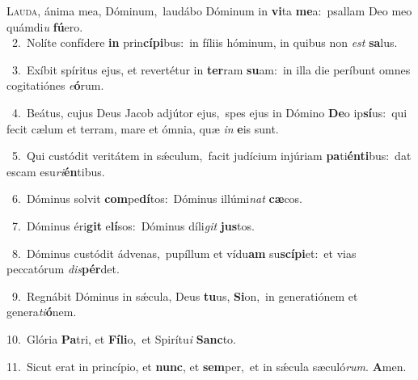 \lettrine{\initial\textcolor{\initialcolor}{L}}{auda,} ánima mea, Dóminum,~\dagger laudábo Dóminum in \textbf{vi}\-ta \textbf{me}\-a:~\star psallam Deo meo quámdi\textit{u} \textbf{fú}\-ero.\\
{\numbfont\textcolor{\numbcolor}{~2.}}~Nolíte confídere \textbf{in} prin\-\textbf{cí}\-\textbf{pi}bus:~\star in fíliis hóminum, in quibus non \textit{est} \textbf{sa}\-lus.\par
{\numbfont\textcolor{\numbcolor}{~3.}}~Exíbit spíritus ejus, et revertétur in \textbf{ter}\-ram \textbf{su}\-am:~\star in illa die períbunt omnes cogitatiónes \textit{e}\-\textbf{ó}rum.\par
{\numbfont\textcolor{\numbcolor}{~4.}}~Beátus, cujus Deus Jacob adjútor ejus,~\dagger spes ejus in Dómino \textbf{De}\-o ip\-\textbf{sí}\-us:~\star qui fecit cælum et terram, mare et ómnia, quæ \textit{in} \textbf{e}\-is sunt.\par
{\numbfont\textcolor{\numbcolor}{~5.}}~Qui custódit veritátem in sǽculum,~\dagger facit judícium injúriam \textbf{pa}\-ti\-\textbf{én}\-\textbf{ti}bus:~\star dat escam esu\-\textit{ri}\-\textbf{én}tibus.\par
{\numbfont\textcolor{\numbcolor}{~6.}}~Dóminus solvit \textbf{com}\-pe\-\textbf{dí}\-tos:~\star Dóminus illúmi\textit{nat} \textbf{cæ}\-cos.\par
{\numbfont\textcolor{\numbcolor}{~7.}}~Dóminus éri\textbf{git} e\-\textbf{lí}\-sos:~\star Dóminus díli\textit{git} \textbf{jus}\-tos.\par
{\numbfont\textcolor{\numbcolor}{~8.}}~Dóminus custódit ádvenas,~\dagger pupíllum et vídu\textbf{am} su\-\textbf{scí}\-\textbf{pi}et:~\star et vias peccatórum \textit{dis}\-\textbf{pér}det.\par
{\numbfont\textcolor{\numbcolor}{~9.}}~Regnábit Dóminus in sǽcula, Deus \textbf{tu}\-us, \textbf{Si}\-on,~\star in generatiónem et genera\-\textit{ti}\-\textbf{ó}nem.\par
{\numbfont\textcolor{\numbcolor}{10.}}~Glória \textbf{Pa}\-tri, et \textbf{Fí}\-\textbf{li}o,~\star et Spirítu\textit{i} \textbf{Sanc}\-to.\par
{\numbfont\textcolor{\numbcolor}{11.}}~Sicut erat in princípio, et \textbf{nunc}\-, et \textbf{sem}\-per,~\star et in sǽcula sæculó\-\textit{rum}\-. \textbf{A}\-men.\par
